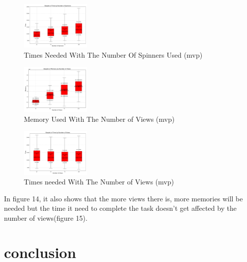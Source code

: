 \documentclass[conference]{IEEEtran}
\begin{document}
\begin{figure}
    [h]
    \centering
    \includegraphics[width = 0.3\textwidth]{Image/mvp_plot_spin_total_time.pdf}
    \caption{Times Needed With The Number Of Spinners Used (mvp)}
    \label{fig:enter-label}
\end{figure}
\begin{figure}
    [h]
    \centering
    \includegraphics[width = 0.3\textwidth]{Image/mvp_plot_view_total_memory.pdf}
    \caption{Memory Used With The Number of Views (mvp)}
    \label{fig:enter-label}
\end{figure}
\begin{figure}
    [h]
    \centering
    \includegraphics[width = 0.3\textwidth]{Image/mvp_plot_view_total_time.pdf}
    \caption{Times needed With The Number of Views (mvp)}
    \label{fig:enter-label}
\end{figure}
In figure 14, it also shows that the more views there is, more memories will be needed but the time it need to complete the task doesn't get affected by the number of views(figure 15).
\section{conclusion}
\end{document}
